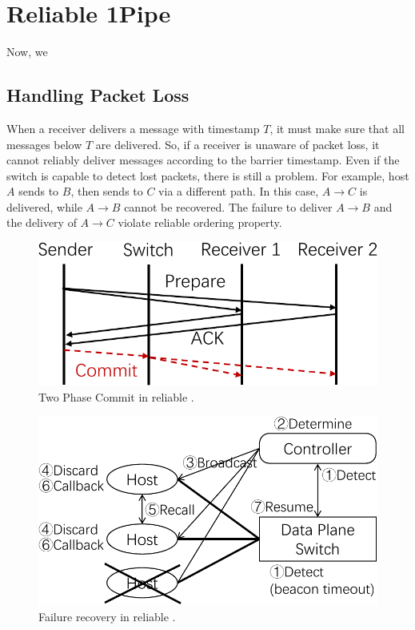 \section{Reliable 1Pipe}
\label{sec:reliable}

Now, we 

\subsection{Handling Packet Loss}

When a receiver delivers a message with timestamp $T$, it must make sure that all messages below $T$ are delivered.
So, if a receiver is unaware of packet loss, it cannot reliably deliver messages according to the barrier timestamp.
Even if the switch is capable to detect lost packets, there is still a problem. %
For example, host $A$ sends to $B$, then sends to $C$ via a different path.
In this case, $A \rightarrow C$ is delivered, while $A \rightarrow B$ cannot be recovered.
The failure to deliver $A \rightarrow B$ and the delivery of $A \rightarrow C$ violate reliable ordering property.


\begin{figure}[t]
\centering
	\includegraphics[width=.3\textwidth]{images/2PC.pdf}
	\caption{Two Phase Commit in reliable \sys{}.}
	\label{fig:2PC}
\end{figure}

\begin{figure}[t]
	\centering
	\includegraphics[width=.35\textwidth]{images/failure_recovery.pdf}
	\caption{Failure recovery in reliable \sys{}.}
	\label{fig:failure_recovery}
\end{figure}

